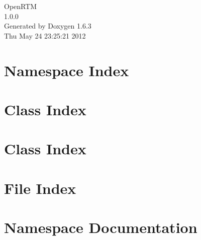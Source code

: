 \documentclass[a4paper]{book}
\begin{document}
\begin{titlepage}
\vspace*{7cm}
\begin{center}
{\Large OpenRTM \\[1ex]\large 1.0.0 }\\
\vspace*{1cm}
{\large Generated by Doxygen 1.6.3}\\
\vspace*{0.5cm}
{\small Thu May 24 23:25:21 2012}\\
\end{center}
\end{titlepage}
\clearemptydoublepage
{}
\tableofcontents
\clearemptydoublepage
{}
\chapter{Namespace Index}

\chapter{Class Index}

\chapter{Class Index}

\chapter{File Index}

\chapter{Namespace Documentation}









\end{document}
